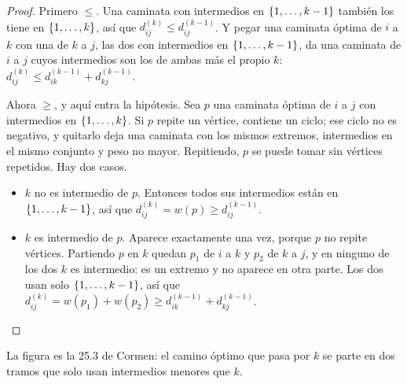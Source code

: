 \documentclass[11pt,letterpaper]{article}
\begin{document}
\begin{proof}
  Primero $\le$. Una caminata con intermedios en
  $\left\{ 1, \dots, k - 1 \right\}$ también los tiene en $\left\{ 1, \dots, k \right\}$,
  así que $d^{(k)}_{ij} \le d^{(k-1)}_{ij}$. Y pegar una caminata
  óptima de $i$ a $k$ con una de $k$ a $j$, las dos con intermedios en
  $\left\{ 1, \dots, k - 1 \right\}$, da una caminata de $i$ a $j$ cuyos
  intermedios son los de ambas más el propio $k$:
  $d^{(k)}_{ij} \le d^{(k-1)}_{ik} + d^{(k-1)}_{kj}$.

  Ahora $\ge$, y aquí entra la hipótesis. Sea $p$ una caminata óptima
  de $i$ a $j$ con intermedios en $\left\{ 1, \dots, k \right\}$. Si $p$ repite
  un vértice, contiene un ciclo; ese ciclo no es negativo, y quitarlo
  deja una caminata con los mismos extremos, intermedios en el mismo
  conjunto y peso no mayor. Repitiendo, $p$ se puede tomar sin
  vértices repetidos. Hay dos casos.
  \begin{itemize}[itemsep=0.1em]
    \item $k$ no es intermedio de $p$. Entonces todos sus intermedios
          están en $\left\{ 1, \dots, k - 1 \right\}$, así que
          $d^{(k)}_{ij} = w(p) \ge d^{(k-1)}_{ij}$.
    \item $k$ es intermedio de $p$. Aparece exactamente una vez,
          porque $p$ no repite vértices. Partiendo $p$ en $k$ quedan
          $p_1$ de $i$ a $k$ y $p_2$ de $k$ a $j$, y en ninguno de los
          dos $k$ es intermedio: es un extremo y no aparece en otra
          parte. Los dos usan solo $\left\{ 1, \dots, k - 1 \right\}$, así que
          $d^{(k)}_{ij} = w(p_1) + w(p_2)
          \ge d^{(k-1)}_{ik} + d^{(k-1)}_{kj}$. \qedhere
  \end{itemize}
\end{proof}

La figura es la 25.3 de Cormen: el camino óptimo que pasa por $k$ se
parte en dos tramos que solo usan intermedios menores que $k$.

\begin{center}
\end{center}
\end{document}
